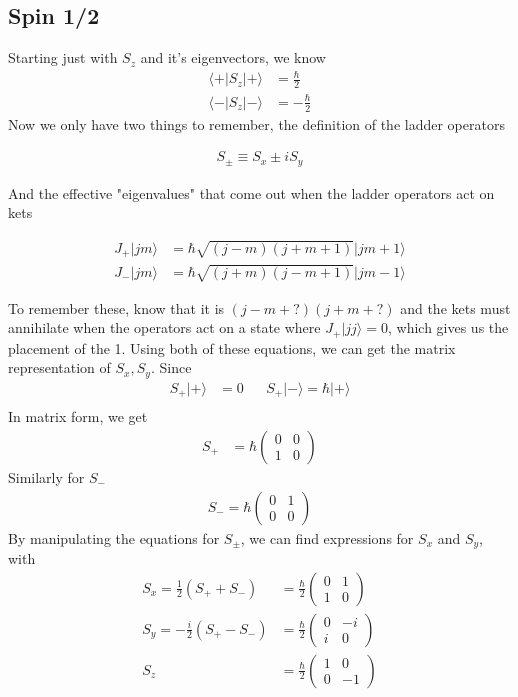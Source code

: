 \subsection{Spin 1/2}
Starting just with $S_z$ and it's eigenvectors, we know
\begin{align}
\langle + |S_z|+\rangle &= \frac{\hbar}{2}\\
\langle - |S_z|-\rangle &= -\frac{\hbar}{2}
\end{align}
Now we only have two things to remember, the definition of the ladder operators

\begin{align}
S_\pm \equiv S_x \pm iS_y
\end{align}

And the effective "eigenvalues" that come out when the ladder operators act on kets

\begin{align}\label{ladder}
J_+|jm\rangle &= \hbar\sqrt{(j-m)(j+m+1)}|jm+1\rangle\\
J_-|jm\rangle &= \hbar\sqrt{(j+m)(j-m+1)}|jm-1\rangle
\end{align}

To remember these, know that it is $(j-m + ?)(j + m + ?)$ and the kets must annihilate when the operators act on a state where $J_+|jj\rangle = 0$, which gives us the placement of the 1. Using both of these equations, we can get the matrix representation of $S_x, S_y$. Since
\begin{align}
S_+|+\rangle &= 0 &&S_+|-\rangle = \hbar|+\rangle\\
\end{align}
In matrix form, we get
\begin{align}
S_+ &= \hbar \left(
{\begin{array}{cc}
0&0\\
1&0
\end{array}}
\right)
\end{align}
Similarly for $S_-$
\begin{align}
S_- = \hbar\left(
{\begin{array}{cc}
0&1\\
0&0
\end{array}}
\right)
\end{align}
By manipulating the equations for $S_\pm$, we can find expressions for $S_x$ and $S_y$, with
\begin{align}
S_x = \frac{1}{2}(S_+ +S_-) &= \frac{\hbar}{2}\left(
{\begin{array}{cc}
0&1\\
1&0
\end{array}}
\right)\\
S_y = -\frac{i}{2}(S_+ - S_-) &= \frac{\hbar}{2}\left(
{\begin{array}{cc}
0&-i\\
i&0
\end{array}}
\right)\\
S_z &= \frac{\hbar}{2}\left(
{\begin{array}{cc}
1&0\\
0&-1
\end{array}}
\right)
\end{align}


